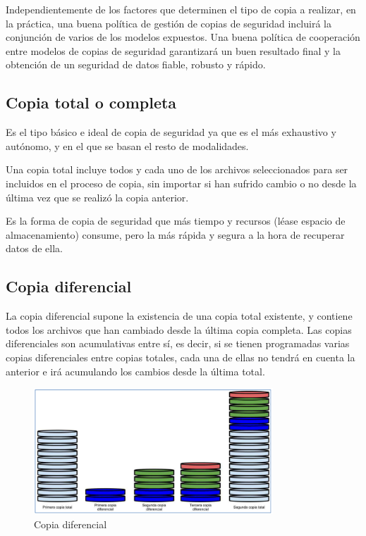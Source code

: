 \documentclass[12pt]{article}
\begin{document}
Independientemente de los factores que determinen el tipo de copia a 
realizar, en la práctica, una buena política de gestión de copias de 
seguridad incluirá la conjunción de varios de los modelos expuestos. Una 
buena política de cooperación entre modelos de copias de seguridad 
garantizará un buen resultado final y la obtención de un seguridad
de datos fiable, robusto y rápido.

\subsection*{Copia total o completa}
Es el tipo básico e ideal de copia de seguridad ya que es el más 
exhaustivo y autónomo, y en el que se basan el resto de modalidades.

Una copia total incluye todos y cada uno de los archivos seleccionados
para ser incluidos en el proceso de copia, sin importar si han 
sufrido cambio o no desde la última vez que se realizó la copia anterior.

Es la forma de copia de seguridad que más tiempo y recursos (léase espacio 
de almacenamiento) consume, pero la más rápida y segura a la hora de 
recuperar datos de ella. 

\subsection*{Copia diferencial}
La copia diferencial supone la existencia de una copia total existente, y
contiene todos los archivos que han cambiado desde la última
copia completa. Las copias diferenciales son acumulativas entre sí, es 
decir, si se tienen programadas varias copias diferenciales entre copias
 totales, cada una de ellas no tendrá en cuenta la anterior e irá 
acumulando los cambios desde la última total.


\begin{figure}[h]
\centering
\includegraphics[width=0.8\textwidth]{diferencial.png}
\renewcommand{\figurename}{Fig.}
\caption{Copia diferencial}
\label{contexto:figura}
\end{figure}
\end{document}

